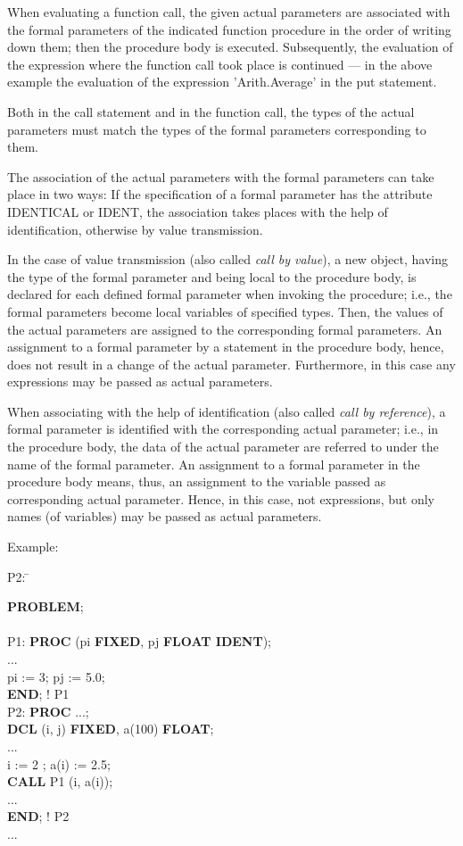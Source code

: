 When evaluating a function call, the given actual parameters are
associated with the formal parameters of the indicated function
procedure in the order of writing down them; then the procedure body is
executed. Subsequently, the evaluation of the expression where the
function call took place is continued --- in the above example the
evaluation of the expression 'Arith.Average' in the put statement.

Both in the call statement and in the function call, the types of the
actual parameters must match the types of the formal parameters
corresponding to them.

The association of the actual parameters with the formal parameters can
take place in two ways: If the specification of a formal parameter has
the attribute IDENTICAL or IDENT, the association takes places with the
help of identification, otherwise by value transmission.

In the case of value transmission (also called {\em call by value}), a
new object, having the type of the formal parameter and being local to
the procedure body, is declared for each defined formal parameter when
invoking the procedure; i.e., the formal parameters become local
variables of specified types. Then, the values of the actual parameters
are assigned to the corresponding formal parameters. An assignment to a
formal parameter by a statement in the procedure body, hence, does not
result in a change of the actual parameter. Furthermore, in this case
any expressions may be passed as actual parameters.

When associating with the help of identification (also called {\em call
by reference}), a formal parameter is identified with the corresponding
actual parameter; i.e., in the procedure body, the data of the actual
parameter are referred to under the name of the formal parameter. An
assignment to a formal parameter in the procedure body means, thus, an
assignment to the variable passed as corresponding actual parameter.
Hence, in this case, not expressions, but only names (of variables) may
be passed as actual parameters.

Example:

\begin{tabbing}
P2: \= \kill

{\bf PROBLEM}; \> \\
    \> \\
P1: \> {\bf PROC} (pi {\bf FIXED}, pj {\bf FLOAT IDENT});\\
    \> ... \\
    \> pi := 3; pj := 5.0;\\
    \> {\bf END}; ! P1\\

P2: \> {\bf PROC} ...;\\
    \> {\bf DCL} (i, j) {\bf FIXED}, a(100) {\bf FLOAT};\\
    \> ... \\
    \> i := 2 ; a(i) := 2.5; \\
    \> {\bf CALL} P1 (i, a(i));\\
    \> ... \\
    \> {\bf END}; ! P2 \\
... \>
\end{tabbing}

